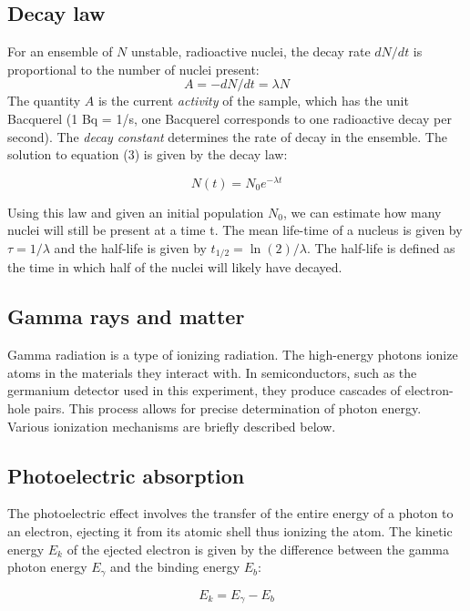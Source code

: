 \documentclass{article}
\begin{document}
\subsection{Decay law}
For an ensemble of $N$ unstable, radioactive nuclei, the decay rate $dN/dt$ is proportional to the number of nuclei present:
\begin{equation}
    A = -dN/dt = \lambda N
\end{equation}
The quantity $A$ is the current \textit{activity} of the sample, which has the unit Bacquerel (1 Bq = 1/s, one Bacquerel corresponds to one radioactive decay per second). The \textit{decay constant} determines the rate of decay in the ensemble. The solution to equation (3) is given by the decay law: 

\begin{equation}
    N(t) = N_0 e^{-\lambda t}
\end{equation}

Using this law and given an initial population $N_0$, we can estimate how many nuclei will still be present at a time t. The mean life-time of a nucleus is given by $\tau = 1/\lambda$ and the half-life is given by $t_{1/2} = \ln{(2)}/\lambda$. The half-life is defined as the time in which half of the nuclei will likely have decayed. 

\pagebreak{}

\subsection{Gamma rays and matter}
Gamma radiation is a type of ionizing radiation. The high-energy photons ionize atoms in the materials they interact with. In semiconductors, such as the germanium detector used in this experiment, they produce cascades of electron-hole pairs. This process allows for precise determination of photon energy. Various ionization mechanisms are briefly described below.

\subsection{Photoelectric absorption}
The photoelectric effect involves the transfer of the entire energy of a photon to an electron, ejecting it from its atomic shell thus ionizing the atom. The kinetic energy $E_k$ of the ejected electron is given by the difference between the gamma photon energy $E_\gamma$ and the binding energy $E_b$: 

\begin{equation}
    E_k = E_\gamma - E_b
\end{equation}
\end{document}
